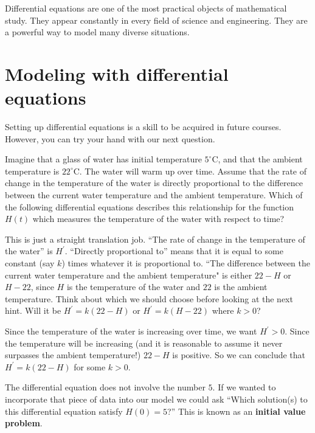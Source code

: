 \documentclass{ximera}
\begin{document}
Differential equations are one of the most practical objects of
mathematical study.  They appear constantly in every field of science
and engineering.  They are a powerful way to model many diverse
situations.





\section{Modeling with differential equations}

Setting up differential equations is a skill to be acquired in future courses. However,
you can try your hand with our next question.

\begin{question}
  Imagine that a glass of water has initial temperature $5^\circ
  \mathrm{C}$, and that the ambient temperature is $22^\circ \mathrm{C}$.
  The water will warm up over time.  Assume that the rate of change in
  the temperature of the water is directly proportional to the
  difference between the current water temperature and the ambient
  temperature.  Which of the following differential equations 
  describes this relationship for the function $H(t)$ which measures the temperature of
  the water with respect to time?
  \begin{multipleChoice}
  \end{multipleChoice}
  \begin{hint}
    This is just a straight translation job.  ``The rate of change in
    the temperature of the water'' is $H^{\prime}$.  ``Directly proportional
    to'' means that it is equal to some constant (say $k$) times
    whatever it is proportional to.  ``The difference between the
    current water temperature and the ambient temperature" is either
    $22-H$ or $H-22$, since $H$ is the temperature of the water and
    $22$ is the ambient temperature.  Think about which we should
    choose before looking at the next hint.  Will it be $H^{\prime}=k(22-H)$
    or $H^{\prime}=k(H-22)$ where $k>0$?
  \end{hint}
  \begin{hint}
    Since the temperature of the water is increasing over time, we
    want $H^{\prime}>0$.  Since the temperature will be increasing (and it is
    reasonable to assume it never surpasses the ambient temperature!)
    $22-H$ is positive.  So we can conclude that $H^{\prime} = k(22-H)$ for
    some $k>0$.
  \end{hint}
  
  \begin{feedback}
    The differential equation does not involve the number $5$.  If we
    wanted to incorporate that piece of data into our model we could
    ask ``Which solution(s) to this differential equation satisfy
    $H(0) = 5$?''  This is known as an \textbf{initial value problem}.  %
  \end{feedback}
\end{question}
\end{document}
